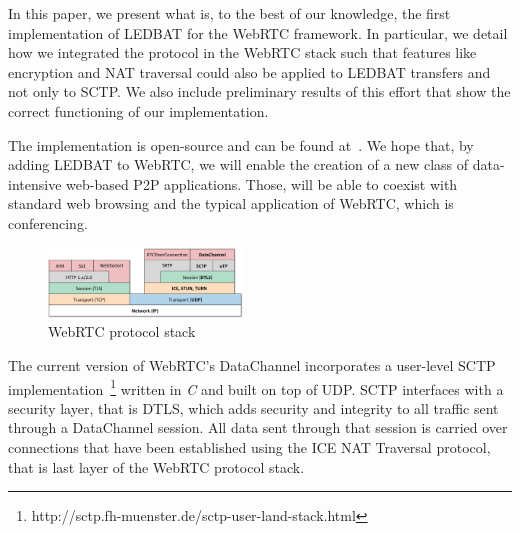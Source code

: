 \documentclass{sig-alternate}
\begin{document}
In this paper, we present what is, to the best of our knowledge, the first implementation
of LEDBAT for the WebRTC framework. In particular, we detail how we integrated the
protocol in the WebRTC stack such that features like encryption and NAT traversal could also 
be applied to LEDBAT transfers and not only to SCTP. We also include
preliminary results of this effort that show the correct functioning of our
implementation.

The implementation is open-source and can be found at~\cite{webrtc-utp}. We hope that, by
adding LEDBAT to WebRTC, we will enable the creation of a new class of data-intensive
web-based P2P applications. Those, will be able to coexist with standard web browsing and
the typical application of WebRTC, which is conferencing.



\begin{figure}[t]
  \centering
    \includegraphics[width=0.46\textwidth]{figs/architecture2}
\vspace*{-0.38cm}
	\caption{WebRTC protocol stack} \label{fig:architecture}
\vspace*{-0.4cm}
\end{figure}


The current version of WebRTC's DataChannel incorporates a user-level SCTP
implementation~\footnote{http://sctp.fh-muenster.de/sctp-user-land-stack.html} written in \textit{C} and built
on top of UDP. SCTP interfaces with a security layer, that is DTLS, which adds security
and integrity to all traffic sent through a DataChannel session.  All data sent through
that session is carried over connections that have been established using the ICE NAT
Traversal protocol, that is last layer of the WebRTC protocol stack.
\end{document}
